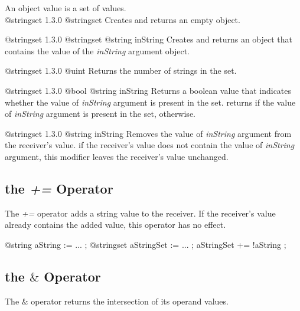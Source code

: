 
An  object value is a set of  values.\\


{@stringset}
{1.3.0}
{@stringset}
{Creates and returns an empty  object.}
{}

{@stringset}
{1.3.0}
{@stringset}
{@string inString}
{Creates and returns an  object that contains the value of the \emph{inString} argument object.}
{}


{@stringset}
{1.3.0}
{@uint}
{Returns the number of strings in the set.}
{}



{@stringset}
{1.3.0}
{@bool}
{@string inString}
{Returns a boolean value that indicates whether the value of \emph{inString} argument is present in the set.}
{returns  if the value of \emph{inString} argument is present in the set,  otherwise.}




{@stringset}
{1.3.0}
{@string inString}
{Removes the value of \emph{inString} argument from the receiver's value.}
{if the receiver's value does not contain the value of \emph{inString} argument, this modifier leaves the receiver's value unchanged.}






\subsection{the \emph{+=} Operator}

The \emph{+=} operator adds a string value to the receiver. If the receiver's value already contains the added value, this operator has no effect.

\exempleTroisLignes
{}
{@string aString := ... ;}
{@stringset aStringSet := ... ;}
{aStringSet += !aString ;}




\subsection{the \emph{$\&$} Operator}

The \emph{$\&$} operator returns the intersection of its operand values.

